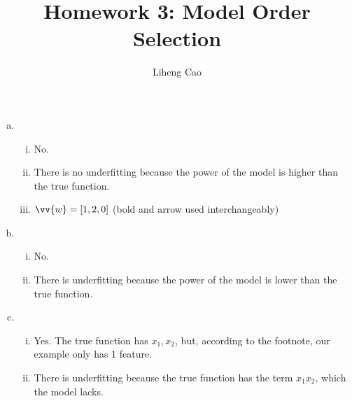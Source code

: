 \documentclass[12pt]{article}
\title{Homework 3: Model Order Selection}
\author{Liheng Cao}
\begin{document}
\maketitle

\section{}
\begin{enumerate}[(a)]
	\item 
	\begin{enumerate} [(i)]
		\item No. 
		
		\item There is no underfitting because the power of the model is higher than the true function.
		
		\item $ \vv{w} = [1, 2, 0] $ (bold and arrow used interchangeably)
	\end{enumerate}

	\item 
	\begin{enumerate} [(i)]
		\item No. 
		
		\item There is underfitting because the power of the model is lower than the true function.
	\end{enumerate}

	\item 
	\begin{enumerate} [(i)]
		\item Yes. The true function has $x_1, x_2$, but, according to the footnote, our example only has 1 feature.
		
		\item There is underfitting because the true function has the term $ x_1x_2 $, which the model lacks.
	\end{enumerate}
\end{enumerate}
\newpage
\end{document}
